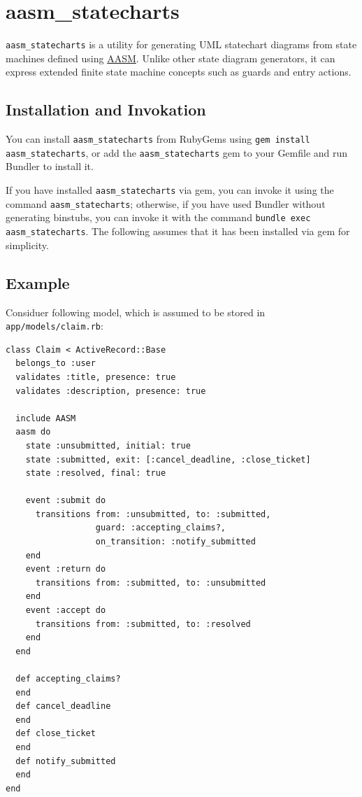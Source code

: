 \documentclass[document.tex]{subfiles}
\begin{document}
\section{aasm\_statecharts}
\label{sec:aasm-statecharts-manual}

{\tt aasm\_statecharts} is a utility for generating UML statechart diagrams from state machines defined using \href{https://github.com/aasm/aasm}{AASM}. Unlike other state diagram generators, it can express extended finite state machine concepts such as guards and entry actions.

\subsection{Installation and Invokation}

You can install {\tt aasm\_statecharts} from RubyGems using {\tt gem install aasm\_statecharts}, or add the {\tt aasm\_statecharts} gem to your Gemfile and run Bundler to install it.

If you have installed {\tt aasm\_statecharts} via gem, you can invoke it using the command {\tt aasm\_statecharts}; otherwise, if you have used Bundler without generating binstubs, you can invoke it with the command {\tt bundle exec aasm\_statecharts}. The following assumes that it has been installed via gem for simplicity.

\pagebreak

\subsection{Example}

Considuer following model, which is assumed to be stored in {\tt app/models/claim.rb}:
\begin{lstlisting}
class Claim < ActiveRecord::Base
  belongs_to :user
  validates :title, presence: true
  validates :description, presence: true

  include AASM
  aasm do
    state :unsubmitted, initial: true
    state :submitted, exit: [:cancel_deadline, :close_ticket]
    state :resolved, final: true

    event :submit do
      transitions from: :unsubmitted, to: :submitted,
                  guard: :accepting_claims?,
                  on_transition: :notify_submitted
    end
    event :return do
      transitions from: :submitted, to: :unsubmitted
    end
    event :accept do
      transitions from: :submitted, to: :resolved
    end
  end

  def accepting_claims?
  end
  def cancel_deadline
  end
  def close_ticket
  end
  def notify_submitted
  end
end
\end{lstlisting}
\end{document}
